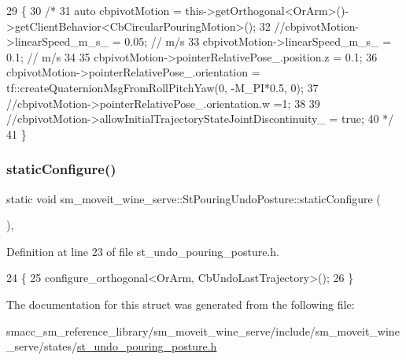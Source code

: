 \begin{DoxyCode}
29         \{
30             \textcolor{comment}{/*}
31 \textcolor{comment}{            auto cbpivotMotion =
       this->getOrthogonal<OrArm>()->getClientBehavior<CbCircularPouringMotion>();}
32 \textcolor{comment}{            //cbpivotMotion->linearSpeed\_m\_s\_ = 0.05; // m/s}
33 \textcolor{comment}{            cbpivotMotion->linearSpeed\_m\_s\_ = 0.1; // m/s}
34 \textcolor{comment}{}
35 \textcolor{comment}{            cbpivotMotion->pointerRelativePose\_.position.z = 0.1;}
36 \textcolor{comment}{            cbpivotMotion->pointerRelativePose\_.orientation = tf::createQuaternionMsgFromRollPitchYaw(0,
       -M\_PI*0.5, 0);}
37 \textcolor{comment}{            //cbpivotMotion->pointerRelativePose\_.orientation.w =1;}
38 \textcolor{comment}{}
39 \textcolor{comment}{            //cbpivotMotion->allowInitialTrajectoryStateJointDiscontinuity\_ = true;}
40 \textcolor{comment}{            */}
41         \}
\end{DoxyCode}
\mbox{\label{structsm__moveit__wine__serve_1_1StPouringUndoPosture_a3be8e120fb67fa0108ee1741bb2e5d1e}} 
\subsubsection{\texorpdfstring{static\+Configure()}{staticConfigure()}}
{\footnotesize\ttfamily static void sm\+\_\+moveit\+\_\+wine\+\_\+serve\+::\+St\+Pouring\+Undo\+Posture\+::static\+Configure (\begin{DoxyParamCaption}{ }\end{DoxyParamCaption})\hspace{0.3cm}{\ttfamily [inline]}, {\ttfamily [static]}}



Definition at line 23 of file st\+\_\+undo\+\_\+pouring\+\_\+posture.\+h.


\begin{DoxyCode}
24         \{
25             configure\_orthogonal<OrArm, CbUndoLastTrajectory>();
26         \}
\end{DoxyCode}


The documentation for this struct was generated from the following file\+:\begin{DoxyCompactItemize}
\item 
smacc\+\_\+sm\+\_\+reference\+\_\+library/sm\+\_\+moveit\+\_\+wine\+\_\+serve/include/sm\+\_\+moveit\+\_\+wine\+\_\+serve/states/\hyperlink{st__undo__pouring__posture_8h}{st\+\_\+undo\+\_\+pouring\+\_\+posture.\+h}\end{DoxyCompactItemize}
